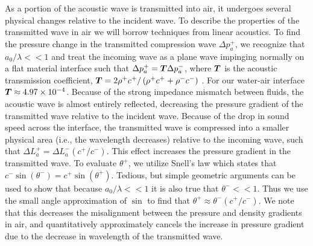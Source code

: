 As a portion of the acoustic wave is transmitted into air, it
undergoes several physical changes relative to the incident wave. To
describe the properties of the transmitted wave in air we will borrow
techniques from linear acoustics. To find the pressure change in the
transmitted compression wave $\Delta p_a^+$, we recognize that
$a_0/\lambda<<1$ and treat the incoming wave as a plane wave impinging
normally on a flat material interface such that
$\Delta p_a^+=\boldsymbol{T} \Delta p_a^-$, where $\boldsymbol{T}$ is the acoustic
transmission coefficient,
$\boldsymbol{T}=2\rho^+ c^+/\left(\rho^+ c^+ + \rho^- c^- \right)$
\citep{Kinsler1982}. For our water-air interface
$\boldsymbol{T}\approx4.97\times10^{-4}$. Because of the strong impedance
mismatch between fluids, the acoustic wave is almost entirely
reflected, decreasing the pressure gradient of the transmitted wave
relative to the incident wave. Because of the drop in sound speed
across the interface, the transmitted wave is compressed into a
smaller physical area (i.e., the wavelength decreases) relative to the
incoming wave, such that $\Delta L_a^+=\Delta L_a^- (c^+/c^-)$. This
effect increases the pressure gradient in the transmitted wave. To
evaluate $\theta^+$, we utilize Snell's law which states that
$c^-\sin{(\theta^-)}=c^+\sin{(\theta^+)}$. Tedious, but simple
geometric arguments can be used to show that because $a_0/\lambda<<1$
it is also true that $\theta^-<<1$. Thus we use the small angle
approximation of $\sin$ to find that
$\theta^+\approx\theta^-(c^+/c^-)$. We note that this decreases the
misalignment between the pressure and density gradients in air, and
quantitatively approximately cancels the increase in pressure gradient
due to the decrease in wavelength of the transmitted wave.

